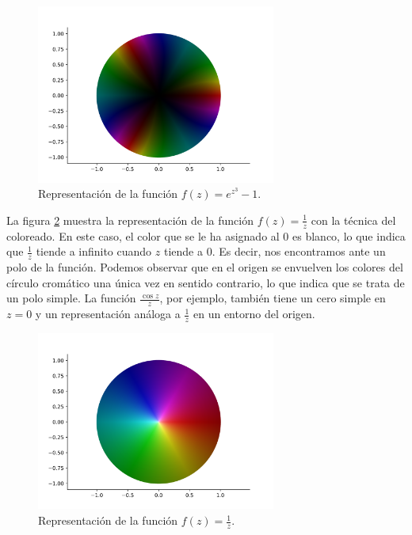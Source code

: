 \begin{figure}[!htbp]
    \centering
    \includegraphics[width=0.7\textwidth]{../Aplicacion/e^(z^3)-1.png}
    \caption{Representación de la función $f(z) = e^{z^3}-1$.}
    \label{fig:e^(z^3)-1}
\end{figure}

La figura \ref{fig:1/z} muestra la representación de la función $f(z) = \frac{1}{z}$ con la técnica del coloreado. En este caso, el color que se le ha asignado al $0$ es blanco, lo que indica que $\frac{1}{z}$ tiende a infinito cuando $z$ tiende a $0$. Es decir, nos encontramos ante un polo de la función. Podemos observar que en el origen se envuelven los colores del círculo cromático una única vez en sentido contrario, lo que indica que se trata de un polo simple. La función $\frac{\cos z}{z}$, por ejemplo, también tiene un cero simple en $z=0$ y un representación análoga a $\frac{1}{z}$ en un entorno del origen. \\

\begin{figure}[!htbp]
    \centering
    \includegraphics[width=0.7\textwidth]{../Aplicacion/1:z.png}
    \caption{Representación de la función $f(z) = \frac{1}{z}$.}
    \label{fig:1/z}
\end{figure}

